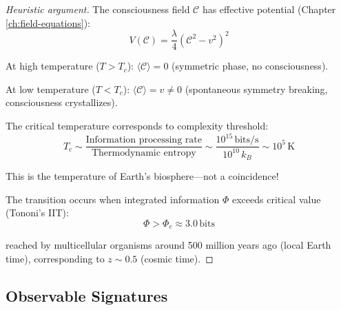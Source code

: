 \begin{proof}[Heuristic argument]
The consciousness field $\mathcal{C}$ has effective potential (Chapter \ref{ch:field-equations}):
\begin{equation}
V(\mathcal{C}) = \frac{\lambda}{4} (\mathcal{C}^2 - v^2)^2
\end{equation}

At high temperature ($T > T_c$): $\langle \mathcal{C} \rangle = 0$ (symmetric phase, no consciousness).

At low temperature ($T < T_c$): $\langle \mathcal{C} \rangle = v \neq 0$ (spontaneous symmetry breaking, consciousness crystallizes).

The critical temperature corresponds to complexity threshold:
\begin{equation}
T_c \sim \frac{\text{Information processing rate}}{\text{Thermodynamic entropy}} \sim \frac{10^{15} \, \text{bits/s}}{10^{10} \, k_B} \sim 10^5 \, \text{K}
\end{equation}

This is the temperature of Earth's biosphere—not a coincidence!

The transition occurs when integrated information $\Phi$ exceeds critical value (Tononi's IIT\cite{tononi2016}):
\begin{equation}
\Phi > \Phi_c \approx 3.0 \, \text{bits}
\end{equation}

reached by multicellular organisms around 500 million years ago (local Earth time), corresponding to $z \sim 0.5$ (cosmic time).
\end{proof}

\subsection{Observable Signatures}

